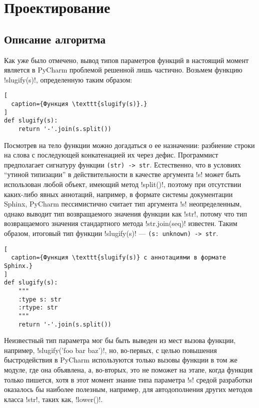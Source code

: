 \chapter{Проектирование}
\label{sec:designing}

\section{Описание алгоритма}

Как уже было отмечено, вывод типов параметров функций в настоящий момент
является в PyCharm проблемой решенной лишь частично. Возьмем функцию
!slugify(s)!, определенную таким образом:

\begin{lstlisting}[
  caption={Функция \texttt{slugify(s)}.} 
]
def slugify(s):
    return '-'.join(s.split())
\end{lstlisting}

Посмотрев на тело функции можно догадаться о ее назначении: разбиение строки на
слова с последующей конкатенацией их через дефис. Программист предполагает
сигнатуру функции \texttt{(str) -> str}. Естественно, что в условиях ``утиной
типизации'' в действительности в качестве аргумента !s! может быть использован любой
объект, имеющий метод !split()!, поэтому при отсутствии каких-либо явных
аннотаций, например, в формате системы документации Sphinx, PyCharm
пессимистично считает тип аргумента !s! неопределенным, однако выводит тип
возвращаемого значения функции как !str!, потому что тип возвращаемого значения
стандартного метода !str.join(seq)! известен. Таким образом, итоговый тип функции
!slugify(s)! --- \texttt{(s: unknown) -> str}.

\begin{lstlisting}[
  caption={Функция \texttt{slugify(s)} c аннотациями в формате Sphinx.}
]
def slugify(s):
    """
    :type s: str
    :rtype: str
    """
    return '-'.join(s.split())
\end{lstlisting}

Неизвестный тип параметра мог бы быть выведен из мест вызова функции, например, 
!slugify('foo bar baz')!, но, во-первых, с целью повышения быстродействия в
PyCharm используются только вызовы функции в том же модуле, где она объявлена,
а, во-вторых, это не поможет на этапе, когда функция только пишется, хотя
в этот момент знание типа параметра !s! средой разработки оказалось бы наиболее
полезным, например, для автодополнения других методов класса !str!, таких как,
!lower()!.

